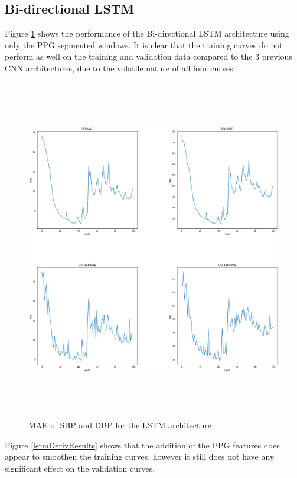 \subsection{Bi-directional LSTM}
Figure \ref{lstmResults} shows the performance of the Bi-directional LSTM architecture using only the PPG segmented windows. 
It is clear that the training curves do not perform as well on the training and validation data compared to the 3 previous CNN architectures, due to the volatile 
nature of all four curves.
\begin{figure}[H]
    \centering
    \includegraphics[width=15cm,height=15cm,keepaspectratio]{Results/lstm.png}
    \caption{MAE of SBP and DBP for the LSTM architecture}
    \label{lstmResults}
\end{figure}\noindent Figure \ref{lstmDerivResults} shows that the addition of the PPG 
features does appear to smoothen the training curves, however it still does not have 
any significant effect on the validation curves.
